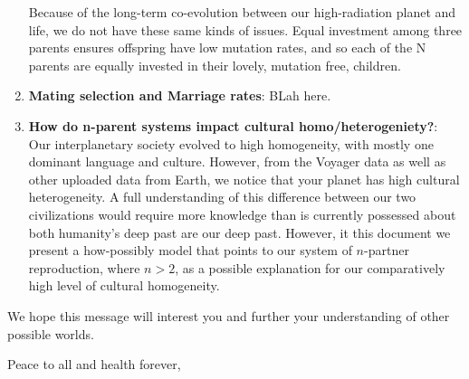 \begin{enumerate}
Because of the long-term co-evolution between our high-radiation planet and life, we do not have these same kinds of issues. Equal investment among three parents ensures offspring have low mutation rates, and so each of the N parents are equally invested in their lovely, mutation free, children. 

\item \textbf{Mating selection and Marriage rates}: BLah here.


\item \textbf{How do n-parent systems impact cultural homo/heterogeniety?}: Our interplanetary society evolved to high homogeneity, with mostly one dominant language and culture. However, from the Voyager data as well as other uploaded data from Earth, we notice that your planet has high cultural heterogeneity. A full understanding of this difference between our two civilizations would require more knowledge than is currently possessed about both humanity's deep past are our deep past. However, it this document we present a how-possibly model that points to our system of $n$-partner reproduction, where $n>2$, as a possible explanation for our comparatively high level of cultural homogeneity.


\end{enumerate}

We hope this message will interest you and further your understanding of other possible worlds. 

Peace to all and health forever, 